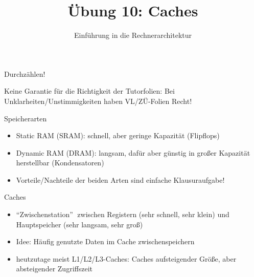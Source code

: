 

\title{Übung 10: Caches}
\subtitle{Einführung in die Rechnerarchitektur}
\date{}



\maketitle

\begin{frame}[c]{}{}
	\begin{center}
		\LARGE  Durchzählen!
	\end{center}
\end{frame}

\begin{frame}[c]{}{}
	\begin{center}
		\LARGE  Keine Garantie für die Richtigkeit der Tutorfolien: Bei Unklarheiten/Unstimmigkeiten
		haben VL/ZÜ-Folien Recht!
	\end{center}
\end{frame}

\begin{frame}[fragile, c]{Speicherarten}{}
	\begin{itemize}
		\item Static RAM (SRAM): schnell, aber geringe Kapazität (Flipflops)
		\item Dynamic RAM (DRAM): langsam, dafür aber günstig in großer Kapazität herstellbar (Kondensatoren)
		\item Vorteile/Nachteile der beiden Arten sind einfache Klausuraufgabe!
	\end{itemize}

\end{frame}

\begin{frame}[fragile, c]{Caches}{}
	\begin{itemize}
		\item \enquote{Zwischenstation} $\;$zwischen Registern (sehr schnell, sehr klein) und Hauptspeicher (sehr langsam, sehr groß)
		\item Idee: Häufig genutzte Daten im Cache zwischenspeichern
		\item heutzutage meist L1/L2/L3-Caches: Caches aufsteigender Größe, aber absteigender Zugriffszeit
	\end{itemize}
\end{frame}


